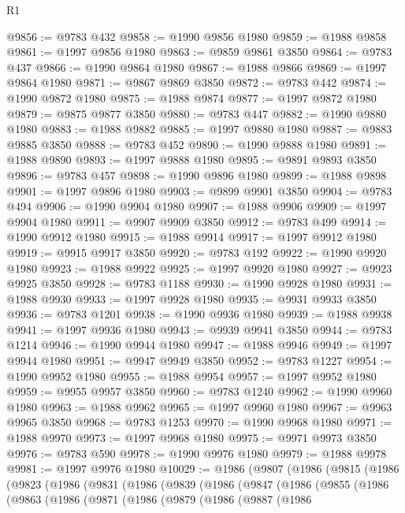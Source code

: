 \begin{lexlean}{R1}
\begin{coremodule}
@9856 := @9783 @432
@9858 := @1990 @9856 @1980
@9859 := @1988 @9858
@9861 := @1997 @9856 @1980
@9863 := @9859 @9861 @3850
@9864 := @9783 @437
@9866 := @1990 @9864 @1980
@9867 := @1988 @9866
@9869 := @1997 @9864 @1980
@9871 := @9867 @9869 @3850
@9872 := @9783 @442
@9874 := @1990 @9872 @1980
@9875 := @1988 @9874
@9877 := @1997 @9872 @1980
@9879 := @9875 @9877 @3850
@9880 := @9783 @447
@9882 := @1990 @9880 @1980
@9883 := @1988 @9882
@9885 := @1997 @9880 @1980
@9887 := @9883 @9885 @3850
@9888 := @9783 @452
@9890 := @1990 @9888 @1980
@9891 := @1988 @9890
@9893 := @1997 @9888 @1980
@9895 := @9891 @9893 @3850
@9896 := @9783 @457
@9898 := @1990 @9896 @1980
@9899 := @1988 @9898
@9901 := @1997 @9896 @1980
@9903 := @9899 @9901 @3850
@9904 := @9783 @494
@9906 := @1990 @9904 @1980
@9907 := @1988 @9906
@9909 := @1997 @9904 @1980
@9911 := @9907 @9909 @3850
@9912 := @9783 @499
@9914 := @1990 @9912 @1980
@9915 := @1988 @9914
@9917 := @1997 @9912 @1980
@9919 := @9915 @9917 @3850
@9920 := @9783 @192
@9922 := @1990 @9920 @1980
@9923 := @1988 @9922
@9925 := @1997 @9920 @1980
@9927 := @9923 @9925 @3850
@9928 := @9783 @1188
@9930 := @1990 @9928 @1980
@9931 := @1988 @9930
@9933 := @1997 @9928 @1980
@9935 := @9931 @9933 @3850
@9936 := @9783 @1201
@9938 := @1990 @9936 @1980
@9939 := @1988 @9938
@9941 := @1997 @9936 @1980
@9943 := @9939 @9941 @3850
@9944 := @9783 @1214
@9946 := @1990 @9944 @1980
@9947 := @1988 @9946
@9949 := @1997 @9944 @1980
@9951 := @9947 @9949 @3850
@9952 := @9783 @1227
@9954 := @1990 @9952 @1980
@9955 := @1988 @9954
@9957 := @1997 @9952 @1980
@9959 := @9955 @9957 @3850
@9960 := @9783 @1240
@9962 := @1990 @9960 @1980
@9963 := @1988 @9962
@9965 := @1997 @9960 @1980
@9967 := @9963 @9965 @3850
@9968 := @9783 @1253
@9970 := @1990 @9968 @1980
@9971 := @1988 @9970
@9973 := @1997 @9968 @1980
@9975 := @9971 @9973 @3850
@9976 := @9783 @590
@9978 := @1990 @9976 @1980
@9979 := @1988 @9978
@9981 := @1997 @9976 @1980
@10029 := @1986
    (@9807
      (@1986
        (@9815
          (@1986
            (@9823
              (@1986
                (@9831
                  (@1986
                    (@9839
                      (@1986
                        (@9847
                          (@1986
                            (@9855
                              (@1986
                                (@9863
                                  (@1986
                                    (@9871
                                      (@1986
                                        (@9879
                                          (@1986
                                            (@9887
                                              (@1986

\end{coremodule}
\end{lexlean}
